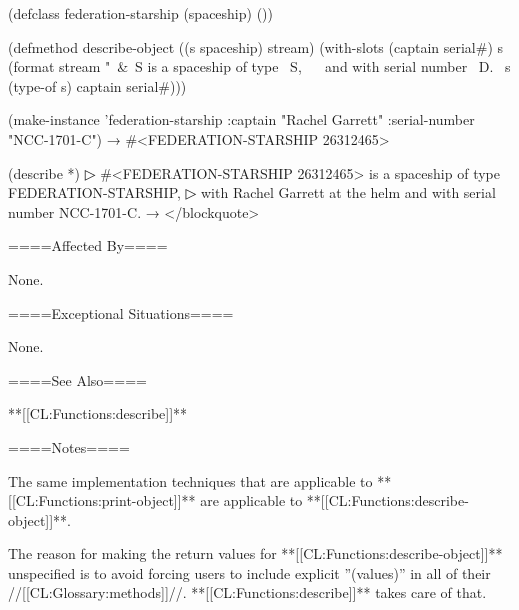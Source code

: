 (defclass federation-starship (spaceship) ())

(defmethod describe-object ((s spaceship) stream) (with-slots (captain serial#) s (format stream "~&~S is a spaceship of type ~S,~ ~ and with serial number ~D.~ s (type-of s) captain serial#)))

(make-instance 'federation-starship :captain "Rachel Garrett" :serial-number "NCC-1701-C") → #<FEDERATION-STARSHIP 26312465>

(describe *)
▷ #<FEDERATION-STARSHIP 26312465> is a spaceship of type FEDERATION-STARSHIP,
▷ with Rachel Garrett at the helm and with serial number NCC-1701-C. → \novalues </blockquote>

====Affected By====

None.

====Exceptional Situations====

None.

====See Also====

**[[CL:Functions:describe]]**

====Notes====

The same implementation techniques that are applicable to **[[CL:Functions:print-object]]** are applicable to **[[CL:Functions:describe-object]]**.

The reason for making the return values for **[[CL:Functions:describe-object]]** unspecified is to avoid forcing users to include explicit ''(values)'' in all of their //[[CL:Glossary:methods]]//. **[[CL:Functions:describe]]** takes care of that.


